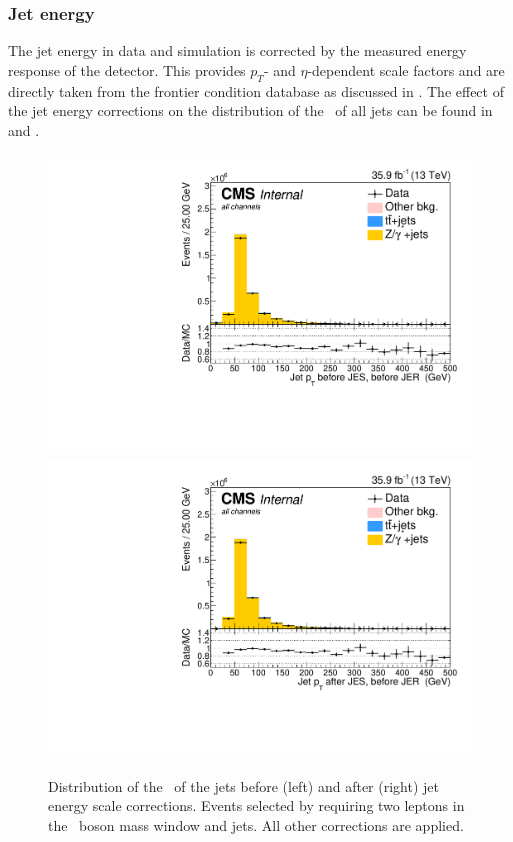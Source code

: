 \subsubsection*{Jet energy}
\label{sec:jer}
The jet energy in data and simulation is corrected by the measured energy response of the detector. This provides $p_T$- and $\eta$-dependent scale factors and are directly taken from the frontier condition database as discussed in . 
The effect of the jet energy corrections on the distribution of the \pt\ of all jets can be found in  and .

\begin{figure}[htbp]
	\centering
	\includegraphics[width=0.49\linewidth]{5_Eventselection/Figures/Reweighing/2lepcontrol_dilep_JetPt_bfJES_all_Stack}
	\includegraphics[width=0.49\linewidth]{5_Eventselection/Figures/Reweighing/2lepcontrol_dilep_JetPt_afJES_all_Stack}
	\caption{Distribution of the \pt\ of the jets before (left) and after (right) jet energy scale corrections. Events selected by requiring two leptons in the \PZ\ boson mass window and jets. All other corrections are applied.}
	\label{fig:jesSF}
\end{figure}

